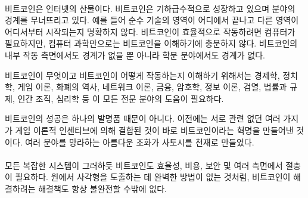 \paragraph{} 
\begin{comment}Bitcoin is a child of the internet. It is growing exponentially,
	blurring the lines between disciplines. It isn’t clear, for example, where the
	realm of pure technology ends and where another realm begins. Even though
	Bitcoin requires computers to function efficiently, computer science is not
	sufficient to understand it. Bitcoin is not only borderless in regards to its
	inner workings but also boundaryless in respect to academic disciplines.
\end{comment}
비트코인은 인터넷의 산물이다. 
비트코인은 기하급수적으로 성장하고 있으며 분야의 경계를 무너뜨리고 있다.
예를 들어 순수 기술의 영역이 어디에서 끝나고 다른 영역이 어디서부터 시작되는지 명확하지 않다.
비트코인이 효율적으로 작동하려면 컴퓨터가 필요하지만, 컴퓨터 과학만으로는 비트코인을 이해하기에 충분하지 않다.
비트코인의 내부 작동 측면에서도 경계가 없을 뿐 아니라 학문 분야에서도 경계가 없다.

\begin{comment}
	Economics, politics, game theory, monetary history, network theory, finance,
	cryptography, information theory, censorship, law and regulation, human
	organization, psychology -- all these and more are areas of expertise which might
	help in the quest of understanding how Bitcoin works and what Bitcoin is.
\end{comment}
비트코인이 무엇이고 비트코인이 어떻게 작동하는지 이해하기 위해서는 
경제학, 정치학, 게임 이론, 화폐의 역사, 네트워크 이론, 금융, 암호학, 정보 이론, 검열, 법률과 규제,
인간 조직, 심리학 등 이 모든 전문 분야의 도움이 필요하다.


\begin{comment}
	No single invention is responsible for its success. It is the combination of
	multiple, previously unrelated pieces, glued together by game theoretical
	incentives, which make up the revolution that is Bitcoin. The beautiful blend of
	many disciplines is what makes Satoshi a genius.
\end{comment}
비트코인의 성공은 하나의 발명품 때문이 아니다.
이전에는 서로 관련 없던 여러 가지가 게임 이론적 인센티브에 의해 결합된 것이 바로 비트코인이라는 혁명을 만들어낸 것이다. 
여러 분야를 망라하는 아름다운 조화가 사토시를 천재로 만들었다. 

\paragraph{} 
\begin{comment}Like every complex system, Bitcoin has to make tradeoffs in terms
	of efficiency, cost, security, and many other properties. Just like there is no
	perfect solution to deriving a square from a circle, any solution to the
	problems which Bitcoin tries to solve will always be imperfect as well.
\end{comment}
모든 복잡한 시스템이 그러하듯 비트코인도 효율성, 비용, 보안 및 여러 측면에서 절충이 필요하다.
원에서 사각형을 도출하는 데 완벽한 방법이 없는 것처럼, 비트코인이 해결하려는 해결책도 항상 불완전할 수밖에 없다.

